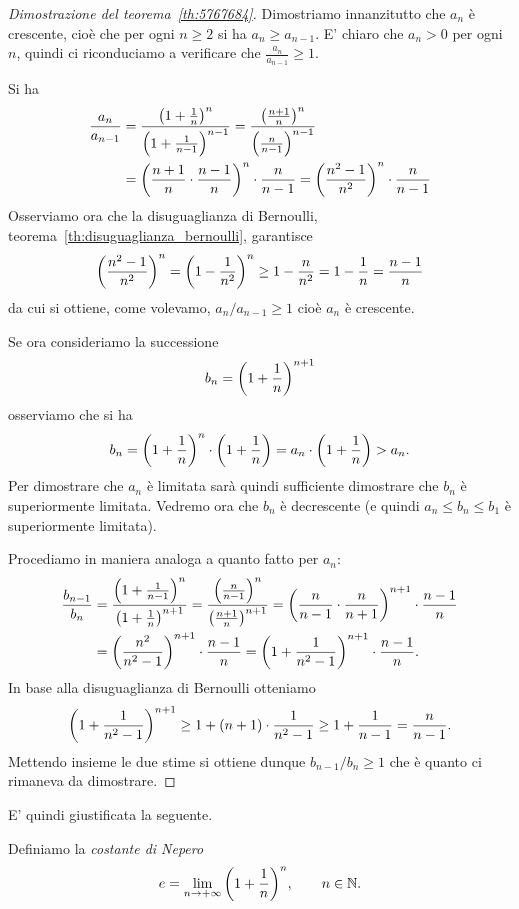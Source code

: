 \begin{proof}[Dimostrazione del teorema~\ref{th:5767684}]
Dimostriamo innanzitutto che $a_n$ è crescente, cioè che
per ogni $n\ge 2$ si ha $a_n \ge a_{n-1}$.
E' chiaro che $a_n>0$ per ogni $n$,
quindi ci riconduciamo a
verificare che $\frac{a_n}{a_{n-1}} \ge 1$.

Si ha
\begin{align*}
\frac{a_n}{a_{n-1}}
&= \frac{{\left( 1+\frac 1 n \right)}^n}{{\left( 1+\frac 1 {n-1} \right)}^{n-1}}
= \frac{{\left( \frac{n+1}{n} \right)}^n}{{\left( \frac{n}{n-1} \right)}^{n-1}}\\
&= {\left( \frac{n+1}{n}\cdot\frac{n-1}{n} \right)}^n \cdot \frac{n}{n-1}
= {\left( \frac{n^2- 1}{n^2} \right)}^n \cdot \frac{n}{n-1}
\end{align*}
Osserviamo ora che la disuguaglianza di Bernoulli, 
teorema~\ref{th:disuguaglianza_bernoulli},
garantisce
\[
  {\left( \frac{n^2 -1}{n^2} \right)}^n
  = {\left( 1-\frac{1}{n^2} \right)}^n
  \ge 1 - \frac{n}{n^2} = 1 - \frac{1}{n} = \frac{n-1}{n}
\]
da cui si ottiene, come volevamo, $a_n / a_{n-1} \ge 1$ cioè
$a_n$ è crescente.

Se ora consideriamo la successione
\[
  b_n = {\left( 1+\frac 1 n \right)}^{n+1}
\]
osserviamo che si ha
\[
  b_n = {\left( 1+\frac 1 n \right)}^n \cdot {\left( 1+\frac 1 n \right)}
   = a_n\cdot {\left( 1+\frac 1 n \right)} > a_n.
\]
Per dimostrare che $a_n$ è limitata sarà quindi sufficiente dimostrare
che $b_n$ è superiormente limitata. Vedremo ora che $b_n$ è decrescente (e quindi $a_n \le b_n \le b_1$ è superiormente limitata).

Procediamo in maniera analoga a quanto fatto per $a_n$:
\begin{align*}
\frac{b_{n-1}}{b_n}
& = \frac{{\left( 1+\frac{1}{n-1} \right)}^n}{{\left( 1+\frac{1}{n} \right)}^{n+1}}
  = \frac{{\left( \frac{n}{n-1} \right)}^n}{{\left( \frac{n+1}{n} \right)}^{n+1}}
  = {\left( \frac{n}{n-1}\cdot\frac{n}{n+1} \right)}^{n+1}\cdot\frac{n-1}{n} \\
& = {\left( \frac{n^2}{n^2-1} \right)}^{n+1} \cdot \frac{n-1}{n}
  = {\left( 1 + \frac{1}{n^2-1} \right)}^{n+1} \cdot \frac{n-1}{n}.
\end{align*}
In base alla disuguaglianza di Bernoulli otteniamo
\[
  {\left( 1 + \frac{1}{n^2-1} \right)}^{n+1}
  \ge 1 + (n+1) \cdot \frac{1}{n^2-1}
  \ge 1 + \frac{1}{n-1} = \frac{n}{n-1}.
\]
Mettendo insieme le due stime si ottiene dunque $b_{n-1}/b_n \ge 1$
che è quanto ci rimaneva da dimostrare.
\end{proof}

E' quindi giustificata la seguente.

\begin{definition}
\mymark{***}
Definiamo la \emph{costante di Nepero}%
%
%
%
%
\[
  e = \lim_{n\to +\infty} {\left( 1+\frac 1 n \right)}^n,
  \qquad n\in{\mathbb N}.
\]
\end{definition}

